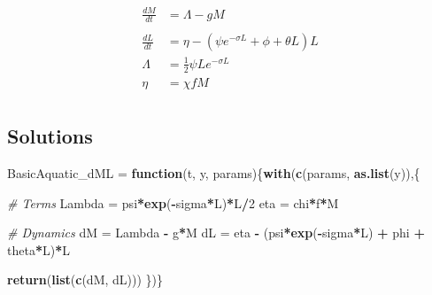 \documentclass[
]{book}
\newenvironment{Shaded}{\begin{snugshade}}{\end{snugshade}}
\newcommand{\CommentTok}[1]{\textcolor[rgb]{0.56,0.35,0.01}{\textit{#1}}}
\newcommand{\ControlFlowTok}[1]{\textcolor[rgb]{0.13,0.29,0.53}{\textbf{#1}}}
\newcommand{\DecValTok}[1]{\textcolor[rgb]{0.00,0.00,0.81}{#1}}
\newcommand{\FunctionTok}[1]{\textcolor[rgb]{0.13,0.29,0.53}{\textbf{#1}}}
\newcommand{\NormalTok}[1]{#1}
\newcommand{\OtherTok}[1]{\textcolor[rgb]{0.56,0.35,0.01}{#1}}
\newcommand{\SpecialCharTok}[1]{\textcolor[rgb]{0.81,0.36,0.00}{\textbf{#1}}}
\begin{document}
\begin{equation}
\begin{array}{rl}
\frac{dM}{dt} &= \Lambda - g M\\  \\ \hline 
\frac{dL}{dt} &= \eta - (\psi e^{-\sigma L} + \phi + \theta L) L \\ 
\Lambda &= \frac{1}{2} \psi L e^{-\sigma L}\\ 
\eta &= \chi f M \\ 
\end{array}
\end{equation}

\subsection{Solutions}\label{solutions-1}

\begin{Shaded}
\begin{Highlighting}[]
\NormalTok{BasicAquatic\_dML }\OtherTok{=} \ControlFlowTok{function}\NormalTok{(t, y, params)\{}\FunctionTok{with}\NormalTok{(}\FunctionTok{c}\NormalTok{(params, }\FunctionTok{as.list}\NormalTok{(y)),\{}
   
  \CommentTok{\# Terms }
\NormalTok{  Lambda }\OtherTok{=}\NormalTok{ psi}\SpecialCharTok{*}\FunctionTok{exp}\NormalTok{(}\SpecialCharTok{{-}}\NormalTok{sigma}\SpecialCharTok{*}\NormalTok{L)}\SpecialCharTok{*}\NormalTok{L}\SpecialCharTok{/}\DecValTok{2} 
\NormalTok{  eta }\OtherTok{=}\NormalTok{ chi}\SpecialCharTok{*}\NormalTok{f}\SpecialCharTok{*}\NormalTok{M }
   
  \CommentTok{\# Dynamics }
\NormalTok{  dM }\OtherTok{=}\NormalTok{ Lambda }\SpecialCharTok{{-}}\NormalTok{ g}\SpecialCharTok{*}\NormalTok{M}
\NormalTok{  dL }\OtherTok{=}\NormalTok{ eta }\SpecialCharTok{{-}}\NormalTok{ (psi}\SpecialCharTok{*}\FunctionTok{exp}\NormalTok{(}\SpecialCharTok{{-}}\NormalTok{sigma}\SpecialCharTok{*}\NormalTok{L) }\SpecialCharTok{+}\NormalTok{ phi }\SpecialCharTok{+}\NormalTok{ theta}\SpecialCharTok{*}\NormalTok{L)}\SpecialCharTok{*}\NormalTok{L }
  
  \FunctionTok{return}\NormalTok{(}\FunctionTok{list}\NormalTok{(}\FunctionTok{c}\NormalTok{(dM, dL)))}
\NormalTok{\})\} }
\end{Highlighting}
\end{Shaded}
\end{document}
